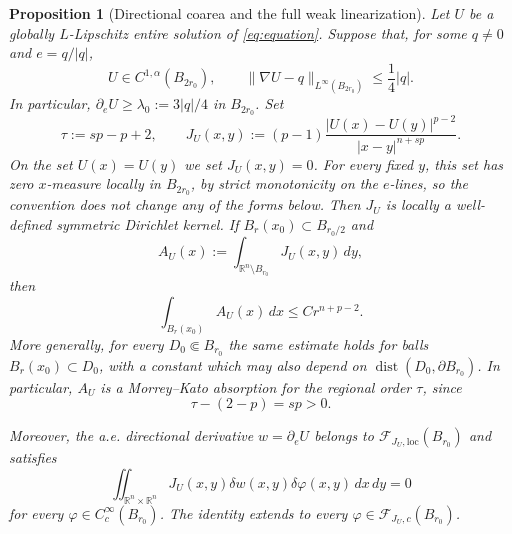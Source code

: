 \documentclass[11pt,reqno]{amsart}
\numberwithin{equation}{section}
\newcommand{\R}{\mathbb R}
\newcommand{\dd}{\,d}
\newtheorem{proposition}[theorem]{Proposition}
\theoremstyle{remark}
\begin{document}
\begin{proposition}[Directional coarea and the full weak linearization]
\label{prop:coarea-weak-linearization}
Let $U$ be a globally $L$-Lipschitz entire solution of
\eqref{eq:equation}.  Suppose that, for some $q\ne0$ and
$e=q/|q|$,
\begin{equation}
 U\in C^{1,\alpha}(B_{2r_0}),
 \qquad
 \|\nabla U-q\|_{L^\infty(B_{2r_0})}\le\frac14|q|.
 \label{eq:strict-directional-monotonicity}
\end{equation}
In particular, $\partial_eU\ge\lambda_0:=3|q|/4$ in $B_{2r_0}$.
Set
\[
 \tau:=sp-p+2,
 \qquad
 J_U(x,y):=(p-1)
 \frac{|U(x)-U(y)|^{p-2}}{|x-y|^{n+sp}}.
\]
On the set \(U(x)=U(y)\) we set \(J_U(x,y)=0\).  For every fixed
\(y\), this set has zero \(x\)-measure locally in \(B_{2r_0}\), by
strict monotonicity on the \(e\)-lines, so the convention does not
change any of the forms below.
Then $J_U$ is locally a well-defined symmetric Dirichlet kernel.  If
$B_r(x_0)\subset B_{r_0/2}$ and
\[
 A_U(x):=\int_{\R^n\setminus B_{r_0}}J_U(x,y)\dd y,
\]
then
\begin{equation}
 \int_{B_r(x_0)}A_U(x)\dd x\le Cr^{n+p-2}.
 \label{eq:crossed-morrey-bound}
\end{equation}
More generally, for every \(D_0\Subset B_{r_0}\) the same estimate
holds for balls \(B_r(x_0)\subset D_0\), with a constant which may also
depend on \(\operatorname{dist}(D_0,\partial B_{r_0})\).
In particular, $A_U$ is a Morrey--Kato absorption for the regional order
$\tau$, since
\begin{equation}
 \tau-(2-p)=sp>0.
 \label{eq:strict-kato-gap}
\end{equation}

Moreover, the a.e. directional derivative \(w=\partial_eU\) belongs to
\(\mathcal F_{J_U,\mathrm{loc}}(B_{r_0})\) and satisfies
\begin{equation}
 \iint_{\R^n\times\R^n}
 J_U(x,y)\delta w(x,y)\delta\varphi(x,y)\dd x\!\dd y=0
\label{eq:full-weak-linearization}
\end{equation}
for every \(\varphi\in C_c^\infty(B_{r_0})\).  The identity extends to
every \(\varphi\in\mathcal F_{J_U,c}(B_{r_0})\).
\end{proposition}
\end{document}
